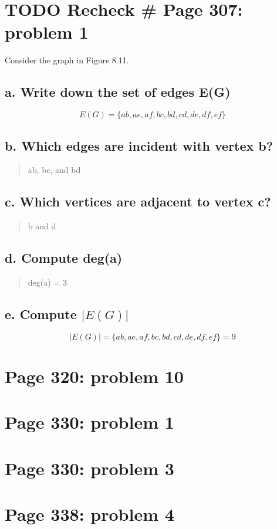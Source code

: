 \documentclass[]{article}
\begin{document}
\section{TODO Recheck \# Page 307: problem
1}\label{todo-recheck-page-307-problem-1}

Consider the graph in Figure 8.11.

\subsection{a. Write down the set of edges
E(G)}\label{a.-write-down-the-set-of-edges-eg}

\[E(G) = \{ab, ae, af, bc, bd, cd, de, df, ef\}\]

\subsection{b. Which edges are incident with vertex
b?}\label{b.-which-edges-are-incident-with-vertex-b}

\begin{quote}
ab, bc, and bd
\end{quote}

\subsection{c. Which vertices are adjacent to vertex
c?}\label{c.-which-vertices-are-adjacent-to-vertex-c}

\begin{quote}
b and d
\end{quote}

\subsection{d. Compute deg(a)}\label{d.-compute-dega}

\begin{quote}
deg(a) = 3
\end{quote}

\subsection{\texorpdfstring{e. Compute
\(|E(G)|\)}{e. Compute \textbar{}E(G)\textbar{}}}\label{e.-compute-eg}

\[|E(G)|= \{ab, ae, af, bc, bd, cd, de, df, ef\} = 9\]

\section{Page 320: problem 10}\label{page-320-problem-10}

\section{Page 330: problem 1}\label{page-330-problem-1}

\section{Page 330: problem 3}\label{page-330-problem-3}

\section{Page 338: problem 4}\label{page-338-problem-4}
\end{document}
